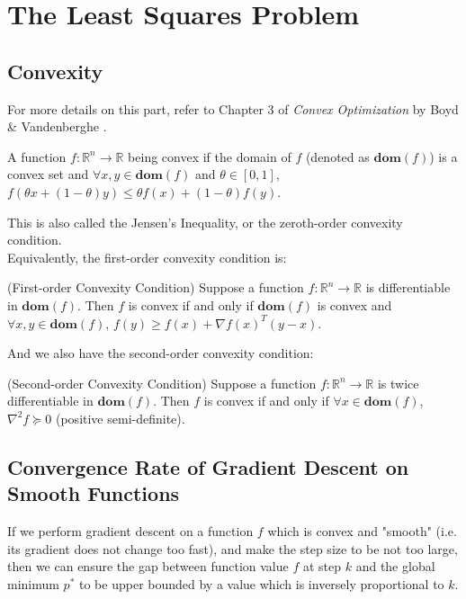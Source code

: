 \documentclass[11pt]{article}
\begin{document}
\section{The Least Squares Problem}
\subsection{Convexity}
For more details on this part, refer to Chapter 3 of \textit{Convex Optimization} by Boyd \& Vandenberghe \cite{boyd2004convex}.
\begin{definition}
A function $f: \mathbb{R}^n \rightarrow \mathbb{R}$ being convex if the domain of $f$ (denoted as $\textbf{dom}(f)$) is a convex set and $\forall x, y \in \textbf{dom}(f)$ and $\theta \in [0,1]$, $f(\theta x + (1- \theta)y) \leq \theta f(x) + (1- \theta)f(y)$.
\end{definition}
This is also called the Jensen's Inequality, or the zeroth-order convexity condition.\\

Equivalently, the first-order convexity condition is: 
\begin{theorem}(First-order Convexity Condition)
Suppose a function $f: \mathbb{R}^n \rightarrow \mathbb{R}$ is differentiable in $\textbf{dom}(f)$. Then $f$ is convex if and only if $\textbf{dom}(f)$ is convex and $\forall x, y \in \textbf{dom}(f)$, $f(y) \geq f(x) + \nabla f(x)^{T}(y-x)$.
\end{theorem}
And we also have the second-order convexity condition:
\begin{theorem}(Second-order Convexity Condition)
Suppose a function $f: \mathbb{R}^n \rightarrow \mathbb{R}$ is twice differentiable in $\textbf{dom}(f)$. Then $f$ is convex if and only if $\forall x \in \textbf{dom}(f)$, $\nabla^2 f \succeq 0$ (positive semi-definite).
\end{theorem}
\subsection{Convergence Rate of Gradient Descent on Smooth Functions \cite{unconstrained}}
If we perform gradient descent on a function $f$ which is convex and "smooth" (i.e. its gradient does not change too fast), and make the step size to be not too large, then we can ensure the gap between function value $f$ at step $k$ and the global minimum $p^{*}$ to be upper bounded by a value which is inversely proportional to $k$.\\
\end{document}
